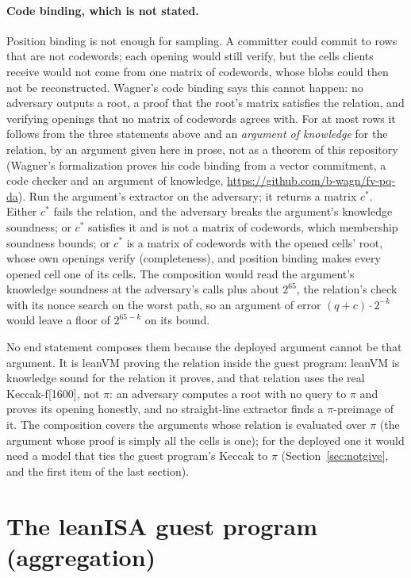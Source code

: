 \documentclass[11pt]{article}
\begin{document}
\paragraph{Code binding, which is not stated.} Position binding is not enough for sampling. A committer could commit to rows that are not codewords; each opening would still verify, but the cells clients receive would not come from one matrix of codewords, whose blobs could then not be reconstructed. Wagner's code binding says this cannot happen: no adversary outputs a root, a proof that the root's matrix satisfies the relation, and verifying openings that no matrix of codewords agrees with. For at most  rows it follows from the three statements above and an \emph{argument of knowledge} for the relation, by an argument given here in prose, not as a theorem of this repository (Wagner's formalization proves his code binding from a vector commitment, a code checker and an argument of knowledge, \url{https://github.com/b-wagn/fv-pq-da}). Run the argument's extractor on the adversary; it returns a matrix $c^*$. Either $c^*$ fails the relation, and the adversary breaks the argument's knowledge soundness; or $c^*$ satisfies it and is not a matrix of codewords, which membership soundness bounds; or $c^*$ is a matrix of codewords with the opened cells' root, whose own openings verify (completeness), and position binding makes every opened cell one of its cells. The composition would read the argument's knowledge soundness at the adversary's calls plus about $2^{65}$, the relation's check with its nonce search on the worst path, so an argument of error $(q + c)\cdot 2^{-k}$ would leave a floor of $2^{65-k}$ on its bound.

No end statement composes them because the deployed argument cannot be that argument. It is leanVM proving the relation inside the guest program: leanVM is knowledge sound for the relation it proves, and that relation uses the real Keccak-f[1600], not $\pi$: an adversary computes a root with no query to $\pi$ and proves its opening honestly, and no straight-line extractor finds a $\pi$-preimage of it. The composition covers the arguments whose relation is evaluated over $\pi$ (the argument whose proof is simply all the cells is one); for the deployed one it would need a model that ties the guest program's Keccak to $\pi$ (Section~\ref{sec:notgive}, and the first item of the last section).

\section{The leanISA guest program (aggregation)}\label{sec:guest}
\end{document}
